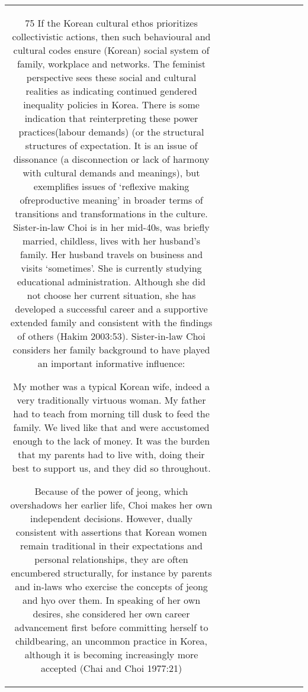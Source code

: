 \begin{table}[h!]
\begin{tabular}{|c|c|c|c|c|c|c|c|c|c|}
{75 If the Korean cultural ethos prioritizes collectivistic actions, then such behavioural and cultural codes ensure (Korean) social system of family, workplace and networks. The feminist perspective sees these social and cultural realities as indicating continued gendered inequality policies in Korea. There is some indication that reinterpreting these power practices(labour demands) (or the structural
structures of expectation. It is an issue of dissonance (a disconnection or lack of harmony with cultural demands and meanings), but exemplifies issues of ‘reflexive making ofreproductive meaning’ in broader terms of transitions and transformations in the culture.
Sister-in-law Choi is in her mid-40s, was briefly married, childless, lives with her husband’s family. Her husband travels on business and visits ‘sometimes’. She is currently studying educational administration. Although she did not choose her current situation, she has developed a successful career and a supportive extended family and consistent with the findings of others (Hakim 2003:53). Sister-in-law Choi considers her family background to have played an important informative influence:

My mother was a typical Korean wife, indeed a very traditionally virtuous woman. My father had to teach from morning till dusk to feed the family. We lived like that and were accustomed enough to the lack of money. It was the burden that my parents had to live with, doing their best to support us, and they did so throughout.

Because of the power of jeong, which overshadows her earlier life, Choi makes her own independent decisions. However, dually consistent with assertions that Korean women remain traditional in their expectations and personal relationships, they are often encumbered structurally, for instance by parents and in-laws who exercise the concepts of jeong and hyo over them. In speaking of her own desires, she considered her own career advancement first before committing herself to childbearing, an uncommon practice in Korea, although it is becoming increasingly more accepted (Chai and Choi 1977:21)

}
\end{tabular}
\end{table}
